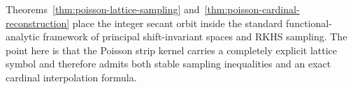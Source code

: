 \begin{remark}
Theorems~\ref{thm:poisson-lattice-sampling}
and~\ref{thm:poisson-cardinal-reconstruction} place the integer secant
orbit inside the standard functional-analytic framework of principal
shift-invariant spaces and RKHS sampling.  The point here is that the
Poisson strip kernel carries a completely explicit lattice symbol and
therefore admits both stable sampling inequalities and an exact cardinal
interpolation formula.
\end{remark}
